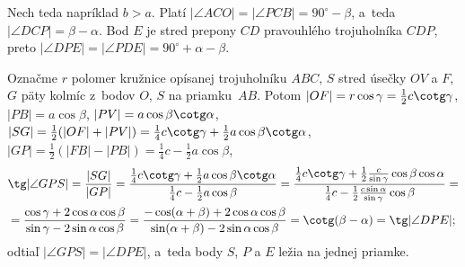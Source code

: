{Nech teda napríklad $b>a$. Platí $|\angle ACO|=|\angle PCB|=90^\circ-\beta$, a~teda $|\angle DCP|=\beta-\alpha$. Bod $E$ je stred prepony $CD$ pravouhlého trojuholníka $CDP$, preto $|\angle DPE|=|\angle PDE|=90^\circ+\alpha-\beta$.

Označme $r$ polomer kružnice opísanej trojuholníku $ABC$, $S$ stred úsečky $OV$ a $F$, $G$ päty kolmíc z~bodov $O$, $S$ na priamku~$AB$. Potom $|OF|=r\cos\gamma=\frac12c\cotg\gamma$, $|PB|=a\cos\beta$,
$|PV|=a\cos\beta\cotg\alpha$,
$|SG|=\frac12(|OF|+|PV|)=\frac14c\cotg\gamma+\frac12a\cos\beta\cotg\alpha$,
$|GP|=\frac12(|FB|-|PB|)=\frac14 c-\frac12a\cos\beta$,
$$
\gathered
\tg|\angle GPS|=\frac{|SG|}{|GP|}=
\frac{\frac14c\cotg\gamma+\frac12a\cos\beta\cotg\alpha}{\frac 14c-\frac12a\cos\beta}=
\frac{\frac14c\cotg\gamma+\frac12\frac c{\sin\gamma}\cos\beta\cos\alpha}{\frac 14c-\frac12\frac{c\sin\alpha}{\sin\gamma}\cos\beta}=\\
=\frac{\cos\gamma+2\cos\alpha\cos\beta}{\sin\gamma-2\sin\alpha\cos\beta}=
\frac{-\cos(\alpha+\beta)+2\cos\alpha\cos\beta}{\sin(\alpha+\beta)-2\sin\alpha\cos\beta}=
\cotg(\beta-\alpha)=\tg|\angle DPE|;
\endgathered
$$
odtiaľ $|\angle GPS|=|\angle DPE|$, a~teda body $S$, $P$ a $E$ ležia na jednej priamke.
\fi
}

